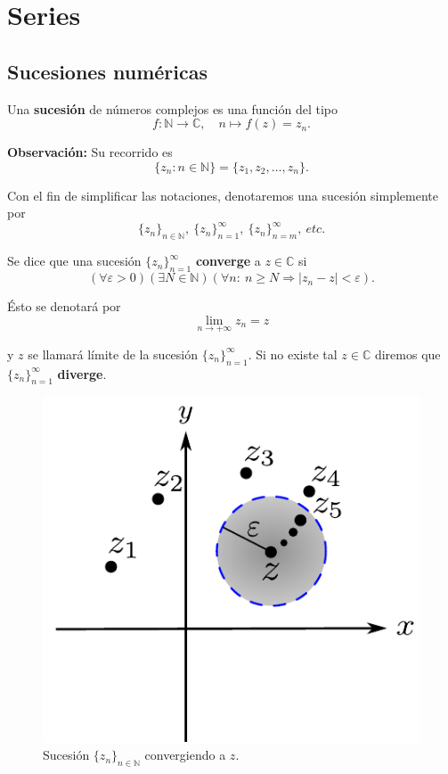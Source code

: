 \chapter{Series}

\section{Sucesiones numéricas}

\begin{defi}
Una \textbf{sucesión} de números complejos es una función del tipo
$$f: \mathbb{N} \rightarrow \mathbb{C}, \quad n \mapsto f(z) = z_n.$$
\end{defi}

\textbf{Observación:} Su recorrido es 
$$\{z_n : n \in \mathbb{N}\} = \{z_1, z_2, \dots, z_n\}.$$

Con el fin de simplificar las notaciones, denotaremos una sucesión simplemente por 
$$\{z_n\}_{n\in \mathbb{N}}, ~ \{z_n\}_{n=1}^{\infty}, ~ \{z_n\}_{n=m}^{\infty}, ~ etc.$$

\begin{defi}
Se dice que una sucesión $\{z_n\}_{n=1}^{\infty}$ \textbf{converge} a $z \in \mathbb{C}$ si
$$(\forall \varepsilon > 0)(\exists N \in \mathbb{N})(\forall n: ~ n \geq N \Rightarrow |z_n - z| < \varepsilon).$$

Ésto se denotará por
$$\lim_{n\to +\infty} z_n = z$$

y $z$ se llamará límite de la sucesión $\{z_n\}_{n=1}^{\infty}$. Si no existe tal $z \in \mathbb{C}$ diremos que $\{z_n\}_{n=1}^{\infty}$ \textbf{diverge}.
\end{defi}

\begin{figure}[H]
    \centering
    \includegraphics[scale = 0.7]{Figuras/ConvergenciaSucesion.pdf}
    \caption{Sucesión $\{z_n\}_{n\in \mathbb{N}}$ convergiendo a $z$.}
    \label{fig:Sucesion}
\end{figure}

